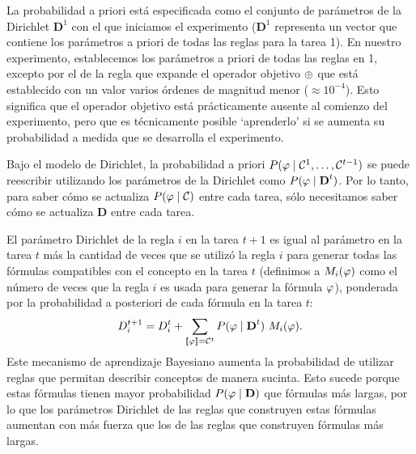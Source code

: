 La probabilidad a priori está especificada como el conjunto de parámetros de la Dirichlet $\textbf{D}^{1}$ con el que iniciamos el experimento ($\textbf{D}^{1}$ representa un vector que contiene los parámetros a priori de todas las reglas para la tarea 1). En nuestro experimento, establecemos los parámetros a priori de todas las reglas en 1, excepto por el de la regla que expande el operador objetivo $\oplus$ que está establecido con un valor varios órdenes de magnitud menor ($\approx 10^{-4}$). Esto significa que el operador objetivo está prácticamente ausente al comienzo del experimento, pero que es técnicamente posible `aprenderlo' si se aumenta su probabilidad a medida que se desarrolla el experimento.


Bajo el modelo de Dirichlet, la probabilidad a priori $P(\varphi\mid \mathcal{C}^{1},\dots,\mathcal{C}^{t-1})$ se puede reescribir utilizando los parámetros de la Dirichlet como $P(\varphi\mid\textbf{D}^{t})$. Por lo tanto, para saber cómo se actualiza $P(\varphi\mid \mathcal{C})$ entre cada tarea, sólo necesitamos saber cómo se actualiza  $\textbf{D}$ entre cada tarea.


El parámetro Dirichlet de la regla $i$ en la tarea $t+1$ es igual al parámetro en la tarea $t$ más la cantidad de veces que se utilizó la regla $i$ para generar todas las fórmulas compatibles con el concepto en la tarea $t$ (definimos a $M_{i}(\varphi)$ como el número de veces que la regla $i$ es usada para generar la fórmula $\varphi$), ponderada por la probabilidad a posteriori de cada fórmula en la tarea $t$:
 \begin{equation}
 D_{i}^{t+1}=D_{i}^{t}+\sum_{\llbracket \varphi\rrbracket=\mathcal{C}^t} P(\varphi\mid \textbf{D}^{t}) \ M_{i}(\varphi). 
 \label{Dirichlet}
 \end{equation}
%
Este mecanismo de aprendizaje Bayesiano aumenta la probabilidad de utilizar reglas que permitan describir conceptos de manera sucinta. Esto sucede porque estas fórmulas tienen mayor probabilidad $P(\varphi\mid \textbf{D})$ que fórmulas más largas, por lo que los parámetros Dirichlet de las reglas que construyen estas fórmulas aumentan con más fuerza que los de las reglas que construyen fórmulas más largas.   

